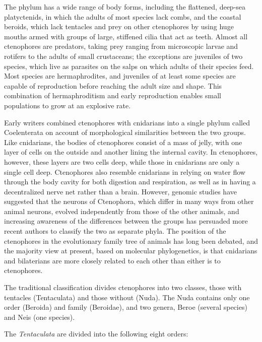 \documentclass[]{book}
\begin{document}
The phylum has a wide range of body forms, including the flattened, deep-sea platyctenids, in which the adults of most species lack combs, and the coastal beroids, which lack tentacles and prey on other ctenophores by using huge mouths armed with groups of large, stiffened cilia that act as teeth. Almost all ctenophores are predators, taking prey ranging from microscopic larvae and rotifers to the adults of small crustaceans; the exceptions are juveniles of two species, which live as parasites on the salps on which adults of their species feed. Most species are hermaphrodites, and juveniles of at least some species are capable of reproduction before reaching the adult size and shape. This combination of hermaphroditism and early reproduction enables small populations to grow at an explosive rate.

Early writers combined ctenophores with cnidarians into a single phylum called Coelenterata on account of morphological similarities between the two groups. Like cnidarians, the bodies of ctenophores consist of a mass of jelly, with one layer of cells on the outside and another lining the internal cavity. In ctenophores, however, these layers are two cells deep, while those in cnidarians are only a single cell deep. Ctenophores also resemble cnidarians in relying on water flow through the body cavity for both digestion and respiration, as well as in having a decentralized nerve net rather than a brain. However, genomic studies have suggested that the neurons of Ctenophora, which differ in many ways from other animal neurons, evolved independently from those of the other animals, and increasing awareness of the differences between the groups has persuaded more recent authors to classify the two as separate phyla. The position of the ctenophores in the evolutionary family tree of animals has long been debated, and the majority view at present, based on molecular phylogenetics, is that cnidarians and bilaterians are more closely related to each other than either is to ctenophores.

The traditional classification divides ctenophores into two classes, those with tentacles (Tentaculata) and those without (Nuda). The Nuda contains only one order (Beroida) and family (Beroidae), and two genera, Beroe (several species) and Neis (one species).

The \emph{Tentaculata} are divided into the following eight orders:
\end{document}
